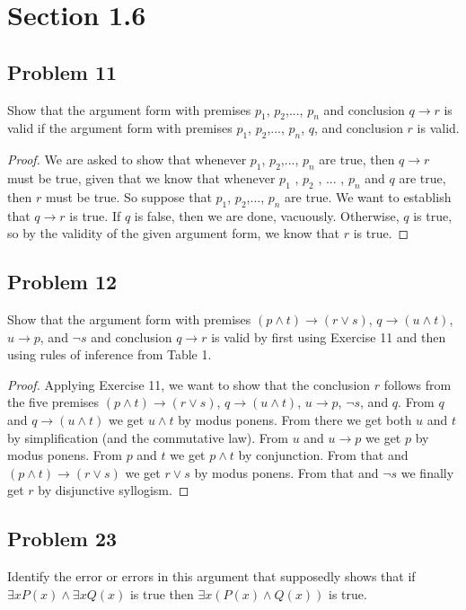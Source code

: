 \documentclass{article}
\begin{document}
\clearpage
\section*{Section 1.6}
\subsection*{Problem 11}
Show that the argument form with premises $p_1$, $p_2$,..., $p_n$ and conclusion $q \rightarrow r$ is valid if the argument form with premises $p_1$, $p_2$,..., $p_n$, $q$, and conclusion $r$ is valid.

\begin{proof}
We are asked to show that whenever $p_1$, $p_2$,..., $p_n$ are true, then $q \rightarrow r$ must be true, given that we know that whenever $p_1$ , $p_2$ , ... , $p_n$ and $q$ are true, then $r$ must be true. So suppose that $p_1$, $p_2$,..., $p_n$ are true. We want to establish that $q \rightarrow r$ is true. If $q$ is false, then we are done, vacuously. Otherwise, $q$ is true, so by the validity of the given argument form, we know that $r$ is true. 
\end{proof}

\subsection*{Problem 12}
Show that the argument form with premises $(p \land t) \rightarrow (r \lor s)$, $q \rightarrow (u \land t)$, $u \rightarrow p$, and $\neg s$ and conclusion $q \rightarrow r$ is valid by first using Exercise 11 and then using rules of inference from Table 1.
\begin{proof}
Applying Exercise 11, we want to show that the conclusion $r$ follows from the five premises $(p \land t) \rightarrow (r \lor s)$, $q \rightarrow (u \land t)$, $u \rightarrow p$, $\neg s$, and $q$. From $q$ and $q \rightarrow (u \land t)$ we get $u \land t$ by modus ponens. From there we get both $u$ and $t$ by simplification (and the commutative law). From $u$ and $u \rightarrow p$ we get $p$ by modus ponens. From $p$ and $t$ we get $p \land t$ by conjunction. From that and $(p \land t) \rightarrow (r \lor s)$ we get $r \lor s$ by modus ponens. From that and $\neg s$ we finally get $r$ by disjunctive syllogism.
\end{proof}

\subsection*{Problem 23}
Identify the error or errors in this argument that supposedly shows that if $\exists xP(x) \land \exists xQ(x)$ is true then $\exists x(P(x) \land Q(x))$ is true.\\
\end{document}
